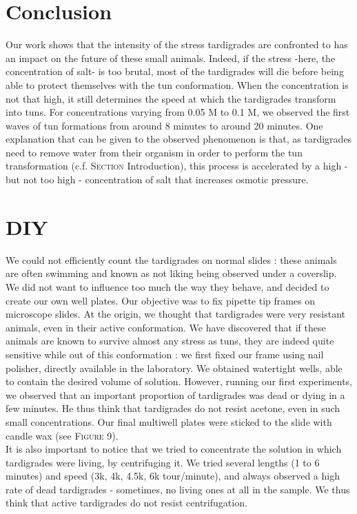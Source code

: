 \documentclass[12pt,a4paper, twocolumn]{article}
\begin{document}
\section*{Conclusion}
Our work shows that the intensity of the stress tardigrades are confronted to has an impact on the future of these small animals. Indeed, if the stress -here, the concentration of salt- is too brutal, most of the tardigrades will die before being able to protect themselves with the tun conformation. When the concentration is not that high, it still determines the speed at which the tardigrades transform into tuns. For concentrations varying from 0.05 M to  0.1 M, we observed the first waves of tun formations from around 8 minutes to around 20 minutes. One explanation that can be given to the observed phenomenon is that, as tardigrades need to remove water from their organism in order to perform the tun transformation (c.f. \textsc{Section} Introduction), this process is accelerated by a high - but not too high - concentration of salt that increases osmotic pressure.


\newpage


\section*{DIY}
We could not efficiently count the tardigrades on normal slides : these animals are often swimming and known as not liking being observed under a coverslip. We did not want to influence too much the way they behave, and decided to create our own well plates. Our objective was to fix pipette tip frames on microscope slides. At the origin, we thought that tardigrades were very resistant animals, even in their active conformation. We have discovered that if these animals are known to survive almost any stress as tuns, they are indeed quite sensitive while out of this conformation : we first fixed our frame using nail polisher, directly available in the laboratory. We obtained watertight wells, able to contain the desired volume of solution. However, running our first experiments, we observed that an important proportion of tardigrades was dead or dying in a few minutes. He thus think that tardigrades do not resist acetone, even in such small concentrations. Our final multiwell plates were sticked to the slide with candle wax (see \textsc{Figure} 9).\\

It is also important to notice that we tried to concentrate the solution in which tardigrades were living, by centrifuging it. We tried several lengths (1 to 6 minutes) and speed (3k, 4k, 4.5k, 6k tour/minute), and always observed a high rate of dead tardigrades - sometimes, no living ones at all in the sample. We thus think that active tardigrades do not resist centrifugation.
\end{document}
